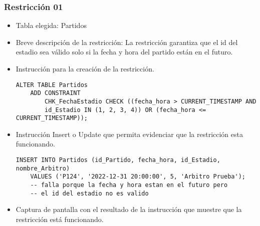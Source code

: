 \subsubsection*{Restricción 01}
\begin{itemize}
    \item Tabla elegida: Partidos
    \item Breve descripción de la restricción: La restricción garantiza que el id del estadio sea válido solo si la fecha y hora del partido están en el futuro.
    \item Instrucción para la creación de la restricción.
    
    \begin{lstlisting}[caption={Tablas para la BdDatos}, label={lst:sql_estadios}]
    ALTER TABLE Partidos
    ADD CONSTRAINT 
        CHK_FechaEstadio CHECK ((fecha_hora > CURRENT_TIMESTAMP AND 
        id_Estadio IN (1, 2, 3, 4)) OR (fecha_hora <= CURRENT_TIMESTAMP));
    \end{lstlisting}

    \item Instrucción Insert o Update que permita evidenciar que la restricción esta funcionando.
    
    \begin{lstlisting}[caption={Tablas para la BdDatos}, label={lst:sql_estadios}]
    INSERT INTO Partidos (id_Partido, fecha_hora, id_Estadio, nombre_Arbitro)
    VALUES ('P124', '2022-12-31 20:00:00', 5, 'Arbitro Prueba'); 
    -- falla porque la fecha y hora estan en el futuro pero 
    -- el id del estadio no es valido    
    \end{lstlisting}

    \item Captura de pantalla con el resultado de la instrucción que muestre que la restricción está
    funcionando.
\end{itemize}


